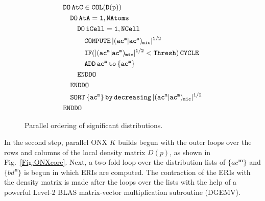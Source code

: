 \documentclass[prl,twocolumn,showpacs,twocolumngrid,superbib]{revtex4}
\begin{document}
\begin{figure}[htbp]
  \centering
  \caption{\protect
    Parallel ordering of significant distributions.
  }\label{Fig:List}
  \begin{equation*}
    \begin{split}
      &\tt          DO\,AtC\in COL(D(p))\\
      &\tt\quad       DO\,AtA=1,NAtoms\\
      &\tt\qquad        DO\,iCell=1,NCell\\
      &\tt\qquad\quad     COMPUTE\,|(ac^m|ac^m)_{mic}|^{1/2}\\
      &\tt\qquad\quad     IF(|(ac^m|ac^m)_{mic}|^{1/2}<{\tt Thresh)\,CYCLE}\\
      &\tt\qquad\quad     ADD\,ac^m\,{\tt to}\, \{ac^m\}\\
      &\tt\qquad        ENDDO\\
      &\tt\quad       ENDDO\\
      &\tt\quad       SORT\,\{ac^m\}\,by\,decreasing\,|(ac^m|ac^m)_{mic}|^{1/2}\\
      &\tt         ENDDO
    \end{split}
  \end{equation*}
\end{figure}

In the second step, parallel ONX $K$ builds begun with the outer loops over
the rows and columns of the local density matrix $D(p)$, 
as shown in Fig.~\ref{Fig:ONXcore}. Next, a two-fold loop over
the distribution lists of $\{ac^\mathbf{m}\}$ and $\{bd^\mathbf{n}\}$
is begun in which ERIs are computed. The contraction of 
the ERIs with the density matrix is made after the loops over the lists with the help of a powerful
Level-2 BLAS matrix-vector multiplication subroutine (DGEMV).
\end{document}
